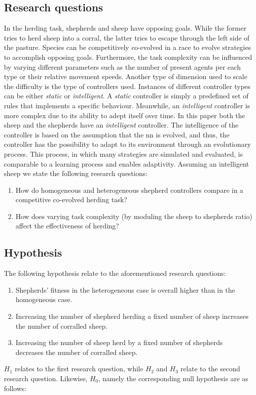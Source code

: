 \documentclass[conference]{IEEEtran}
\begin{document}
\subsection{Research questions}
\label{sec:researchQuestions}
In the herding task, shepherds and sheep have opposing goals.
While the former tries to herd sheep into a corral, the latter tries to escape through the left side of the pasture. 
Species can be competitively co-evolved in a race to evolve strategies to accomplish opposing goals. 
Furthermore, the task complexity can be influenced by varying different parameters such as the number of present agents per each type or their relative movement speeds. 
Another type of dimension used to scale the difficulty is the type of controllers used.
Instances of different controller types can be either \textit{static} or \textit{intelligent}.
A \textit{static} controller is simply a predefined set of rules that implements a specific behaviour.
Meanwhile, an \textit{intelligent} controller is more complex due to its ability to adept itself over time.
In this paper both the sheep and the shepherds have an \textit{intelligent} controller.
The intelligence of the controller is based on the assumption that the \gls{nn} is evolved, and thus, the controller has the possibility to adapt to its environment through an evolutionary process. 
This process, in which many strategies are simulated and evaluated, is comparable to a learning process and enables adaptivity. 
Assuming an intelligent sheep we state the following research questions:

\begin{enumerate}
	\item How do homogeneous and heterogeneous shepherd controllers compare in a competitive co-evolved herding task?
	\item How does varying task complexity (by moduling the sheep to shepherds ratio) affect the effectiveness of herding?
\end{enumerate}

\subsection{Hypothesis}
\label{sec:hypothesis}
The following hypothesis relate to the aforementioned research questions:

\begin{enumerate}
	\item Shepherds' fitness in the heterogeneous case is overall higher than in the homogeneous case.
	\item Increasing the number of shepherd herding a fixed number of sheep increases the number of corralled sheep.
	\item Increasing the number of sheep herd by a fixed number of shepherds decreases the number of corralled sheep.
\end{enumerate}
$H_1$ relates to the first research question, while $H_2$ and $H_3$ relate to the second research question.
Likewise, $H_0$, namely the corresponding null hypothesis are as follows:
\end{document}
